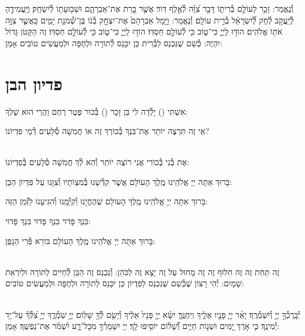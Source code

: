 \documentclass[twoside, openany, parskip=half, 11pt]{book}
\begin{document}

וְ֯נֶאֱמַר: זָכַ֣ר לְעוֹלָ֣ם בְּ֯רִית֑וֹ דָּבָ֥ר צִ֝וָּ֗ה לְ֯אֶ֣לֶף דּֽוֹר׃ אֲשֶׁ֣ר כָּ֭רַת אֶת־אַבְרָהָ֑ם
וּשְׁב֖וּעָת֣וֹ לְ֯יִשְׂחָֽק׃ וַיַּֽעֲמִידֶ֣הָ לְ֯יַֽעֲקֹ֣ב לְ֯חֹ֑ק לְ֝֯יִשְׂרָאֵ֗ל בְּ֯רִ֣ית עוֹלָֽם׃
וְ֯נֶאֱמַר: וַיָּ֤מָל אַבְרָהָם֙ אֶת־יִצְחָ֣ק בְּ֯נ֔וֹ בֶּן־שְׁ֯מֹנַ֖ת יָמִ֑ים כַּֽאֲשֶׁ֛ר צִוָּ֥ה אֹת֖וֹ אֱלֹהִֽים׃ הוֹד֣וּ לַֽיְיָ֑ כִּי־ט֑וֹב כִּ֖י לְ֯עוֹלָ֣ם חַסְדּֽוֹ׃
הוֹד֣וּ לַֽיְיָ֑ כִּי־ט֑וֹב כִּ֖י לְ֯עוֹלָ֣ם חַסְדּֽוֹ׃
 זֶה הַקָּטֹן גָּדוֹל יִהְיֶה:
כְּ֯שֵׁם שֶׁנִּכְנַס לַבְּ֯רִית כֵּן יִכָּנֵס לְ֯תוֹרָה וּלְחֻפָּה וּלְמַעֲשִׂים טוֹבִים אָמֵן:

\vfill
\sepline

\chapter[פדיון הבן]{ פדיון הבן }


אִשְׁתִּי () יָלְ֯דָה לִי בֵּן זָכָר () בְּ֯כוֹר פֶּטֶר רֶחֶם וַהֲרֵי הוּא שֶׁלְךָ:

אֵי זֶה תִּרְצֶה יוֹתֵר אֶת־בִּנְךָ בְּ֯כוֹרֶךָ זֶה אוֹ חֲמִשָׁה סְ֯לָעִים דְ֯מֵי פִּדְיוֹנוֹ?

\\
אֶת בְּ֯נִי בְּ֯כוֹרִי אֲנִי רוֹצֶה יוֹתֵר וְ֯הֵא לְ֯ךָ חֲמִשָׁה סְ֯לָעִים בְּ֯פִדְיוֹנוֹ:

בָּרוּךְ אַתָּה יְיָ אֱלֹהֵֽינוּ מֶֽלֶךְ הָעוֹלָם אֲשֶׁר קִדְּ֯שָׁנוּ בְּ֯מִצְוֹתָיו וְ֯צִוָּֽנוּ עַל פִּדְיוֹן הַבֵּן:

בָּרוּךְ אַתָּה יְיָ אֱלֹהֵֽינוּ מֶֽלֶךְ הָעוֹלָם שֶׁהֶחֱיָנוּ וְ֯קִיְּ֯מָֽנוּ וְ֯הִגִּיעָנוּ לַזְּ֯מַן הַזֶּה:


בִּנְךָ פָּדוּי בִּנְךָ פָּדוּי בִּנְךָ פָּדוּי:

בָּרוּךְ אַתָּה יְיָ אֱלֹהֵֽינוּ מֶֽלֶךְ הָעוֹלָם בּוֹרֵא פְּ֯רִי הַגָפֶן:

 \\
זֶה תַּחַת זֶה זֶה חִלוּף זֶה זֶה מָחוּל עַל זֶה יָצָא זֶה לַכֹּהֵן:
וְ֯נִכְנַס זֶה הַבֵּן לְ֯חַיִּים לַתּוֹרָה וּלְיִרְאַת שָׁמָיִם:
יְ֯הִי רָצוֹן שֶׁכְּ֯שֵׁם שֶׁנִכְנַס לַפִּדְיוֹן כֵּן יִכָּנֵס לַתוֹרָה וּלְחֻפָּה וּלְמַעֲשִׂים טוֹבִים:

\\
יְ֯בָֽרֶכְ֯ךָ֣ יְיָ֖ וְ֯יִשְׁמְ֯רֶֽךָ׃ יָאֵ֨ר יְיָ֧ פָּנָ֛יו אֵלֶ֖יךָ וִֽיחֻנֶּֽךָּ׃ יִשָּׂ֨א יְיָ֤ פָּנָיו֙ אֵלֶ֔יךָ וְ֯יָשֵׂ֥ם לְ֯ךָ֖ שָׁלֽוֹם׃
יְיָ֥ שֹֽׁמְ֯רֶ֑ךָ יְיָ֥ צִ֝לְּ֯ךָ֗ עַל־יַ֥ד יְ֯מִינֶֽךָ׃
כִּ֤י אֹ֣רֶךְ יָ֭מִים וּשְׁנ֣וֹת חַיִּ֑ים וְ֝֯שָׁל֗וֹם יוֹסִ֥יפוּ לָֽךְ׃
יְיָׄ יִשְׁמָרְ֯ךָ֥ מִכׇּל־רָ֑ע יִ֝שְׁמֹ֗ר אֶת־נַפְשֶֽׁךָ׃ אָמֵן:
\end{document}
